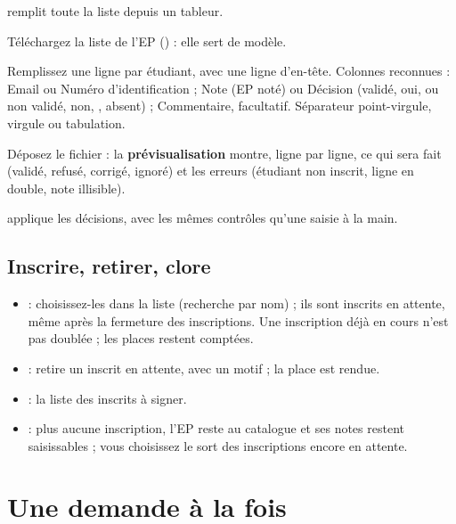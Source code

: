\documentclass[11pt,a4paper]{article}
\begin{document}
 remplit toute la liste depuis un tableur.
\begin{etapes}
  \item Téléchargez la liste de l'EP () : elle sert de modèle.
  \item Remplissez une ligne par étudiant, avec une ligne d'en-tête. Colonnes reconnues :
    \og Email\fg{} ou \og Numéro d'identification\fg{} ; \og Note\fg{} (EP noté) ou
    \og Décision\fg{} (\og validé\fg{}, \og oui\fg{}, \fg{} ou \og non validé\fg{},
    \og non\fg{}, \fg{}, \og absent\fg{}) ; \og Commentaire\fg{}, facultatif. Séparateur
    point-virgule, virgule ou tabulation.
  \item Déposez le fichier : la \textbf{prévisualisation} montre, ligne par ligne, ce qui sera
    fait (validé, refusé, corrigé, ignoré) et les erreurs (étudiant non inscrit, ligne en
    double, note illisible).
  \item {} applique les décisions, avec les mêmes contrôles qu'une
    saisie à la main.
\end{etapes}


\subsection{Inscrire, retirer, clore}

\begin{itemize}
  \item {} : choisissez-les dans la liste (recherche par nom) ; ils
    sont inscrits en attente, même après la fermeture des inscriptions. Une inscription déjà en
    cours n'est pas doublée ; les places restent comptées.
  \item {} : retire un inscrit en attente, avec un motif ; la place est rendue.
  \item {} : la liste des inscrits à signer.
  \item {} : plus aucune inscription, l'EP reste au catalogue et ses notes
    restent saisissables ; vous choisissez le sort des inscriptions encore en attente.
\end{itemize}


\section{Une demande à la fois}\label{sec:demande}
\end{document}
